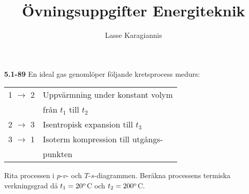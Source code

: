 \documentclass[twocolumn]{book}
\title{Övningsuppgifter Energiteknik}
\author{Lasse Karagiannis}
\begin{document}
\noindent\textbf{5.1-89}\hfill\break
\noindent En ideal gas genomlöper följande kretsprocess medurs:\hfil\par
\noindent\begin{tabular}{ l l  } 
1 $\rightarrow$ 2 & Uppvärmning under konstant volym\\
                  & från $t_1$ till $t_2$  \\ 
2 $\rightarrow$ 3 & Isentropisk expansion till $t_3$  \\ 
3 $\rightarrow$ 1 & Isoterm kompression till utgångs-\\
                  &punkten \\ 
\end{tabular}


Rita processen i $p$-$v$- och $T$-$s$-diagrammen. Beräkna processens termiska
verkningsgrad då $t_1=20^{\rm{o}}$C och $t_2=200^{\rm{o}}$C.

\bigskip
\end{document}
